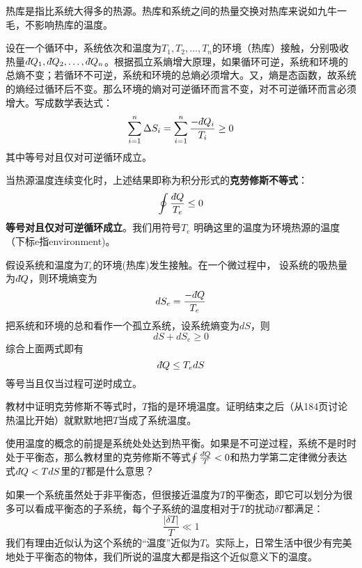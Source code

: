\documentclass[CJK]{beamer}
\begin{document}
\begin{frame}
\bch
热库是指比系统大得多的热源。热库和系统之间的热量交换对热库来说如九牛一毛，不影响热库的温度。

\ech
\end{frame}


\begin{frame}
\bch
{\small
设在一个循环中，系统依次和温度为$T_1, T_2, \ldots, T_n$的环境（热库）接触，分别吸收热量$\dbar Q_1, \dbar Q_2, \ldots, \dbar Q_n$。根据孤立系熵增大原理，如果循环可逆，系统和环境的总熵不变；若循环不可逆，系统和环境的总熵必须增大。又，熵是态函数，故系统的熵经过循环后不变。那么环境的熵对可逆循环而言不变，对不可逆循环而言必须增大。写成数学表达式：
$$\sum_{i=1}^n \Delta S_i = \sum_{i=1}^n \frac{-\dbar Q_i}{T_i} \ge 0$$
其中等号对且仅对可逆循环成立。

当热源温度连续变化时，上述结果即称为积分形式的{\bf 克劳修斯不等式}：
{\blue $$\oint \frac{\dbar Q}{T_e} \le 0 $$}
{\bf 等号对且仅对可逆循环成立}。我们用符号$T_e$ 明确这里的温度为环境热源的温度（下标e指environment)。
}
\ech
\end{frame}


\begin{frame}
\bch
假设系统和温度为$T_e$的环境(热库)发生接触。在一个微过程中，
设系统的吸热量为$\dbar Q$，则环境熵变为
$$ dS_e = \frac{-\dbar Q}{T_e} $$
把系统和环境的总和看作一个孤立系统，设系统熵变为$dS$，则
$$dS +dS_e \ge 0$$
综合上面两式即有
{\blue $$\dbar Q \le T_e dS $$
等号当且仅当过程可逆时成立}。
\ech
\end{frame}


\begin{frame}
\bch

教材中证明克劳修斯不等式时，$T$指的是环境温度。证明结束之后（从184页讨论热温比开始）就默默地把$T$当成了系统温度。

\ech
\end{frame}


\begin{frame}
\bch
使用温度的概念的前提是系统处处达到热平衡。如果是不可逆过程，系统不是时时处于平衡态，那么教材里的克劳修斯不等式$\oint \frac{\dbar Q}{T} < 0$和热力学第二定律微分表达式$\dbar Q < TdS$里的$T$都是什么意思？
\ech
\end{frame}

\begin{frame}
\bch
如果一个系统虽然处于非平衡态，但很接近温度为$T$的平衡态，即它可以划分为很多可以看成平衡态的子系统，每个子系统的温度相对于$T$的扰动$\delta T$都满足：
$$ \frac{|\delta T|}{T} \ll 1$$
我们有理由近似认为这个系统的“温度”近似为$T$。实际上，日常生活中很少有完美地处于平衡态的物体，我们所说的温度大都是指这个近似意义下的温度。
\ech
\end{frame}
\end{document}
